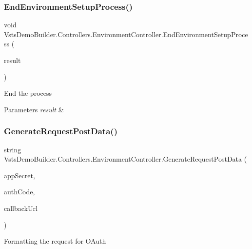 \subsubsection{\texorpdfstring{End\+Environment\+Setup\+Process()}{EndEnvironmentSetupProcess()}}
{\footnotesize\ttfamily void Vsts\+Demo\+Builder.\+Controllers.\+Environment\+Controller.\+End\+Environment\+Setup\+Process (\begin{DoxyParamCaption}\item[{I\+Async\+Result}]{result }\end{DoxyParamCaption})}



End the process 


\begin{DoxyParams}{Parameters}
{\em result} & \\
\hline
\end{DoxyParams}
\mbox{\label{class_vsts_demo_builder_1_1_controllers_1_1_environment_controller_ac983d0c1775718689aff6f7a17c0b929}} 
\subsubsection{\texorpdfstring{Generate\+Request\+Post\+Data()}{GenerateRequestPostData()}}
{\footnotesize\ttfamily string Vsts\+Demo\+Builder.\+Controllers.\+Environment\+Controller.\+Generate\+Request\+Post\+Data (\begin{DoxyParamCaption}\item[{string}]{app\+Secret,  }\item[{string}]{auth\+Code,  }\item[{string}]{callback\+Url }\end{DoxyParamCaption})}



Formatting the request for O\+Auth 


